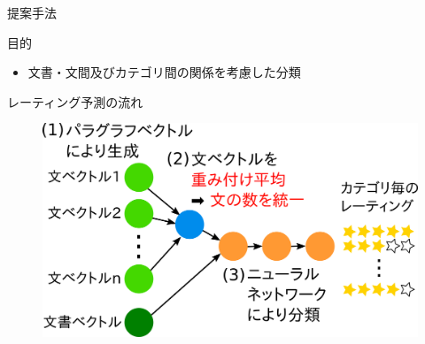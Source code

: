 \documentclass[aspectratio=43,unicode,10pt]{beamer}
\begin{document}
\begin{frame}{提案手法}{}
  \begin{block}{目的}
    \begin{itemize}
      \item 文書・文間及びカテゴリ間の関係を考慮した分類
    \end{itemize}
  \end{block}
  \begin{block}{レーティング予測の流れ}
    \begin{figure}
      \includegraphics[width=0.7\linewidth]
                      {fig/model_with_detailed_processes.png}
    \end{figure}
  \end{block}
\end{frame}
\end{document}
